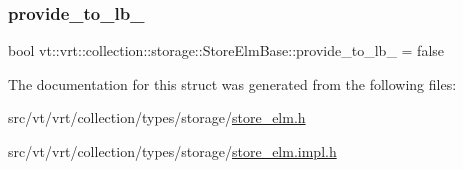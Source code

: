 \mbox{\label{structvt_1_1vrt_1_1collection_1_1storage_1_1_store_elm_base_a2818c3e0d6a4c0705170f98c0b51347e}} 
\subsubsection{\texorpdfstring{provide\+\_\+to\+\_\+lb\+\_\+}{provide\_to\_lb\_}}
{\footnotesize\ttfamily bool vt\+::vrt\+::collection\+::storage\+::\+Store\+Elm\+Base\+::provide\+\_\+to\+\_\+lb\+\_\+ = false\hspace{0.3cm}{\ttfamily [protected]}}



The documentation for this struct was generated from the following files\+:\begin{DoxyCompactItemize}
\item 
src/vt/vrt/collection/types/storage/\hyperlink{store__elm_8h}{store\+\_\+elm.\+h}\item 
src/vt/vrt/collection/types/storage/\hyperlink{store__elm_8impl_8h}{store\+\_\+elm.\+impl.\+h}\end{DoxyCompactItemize}
